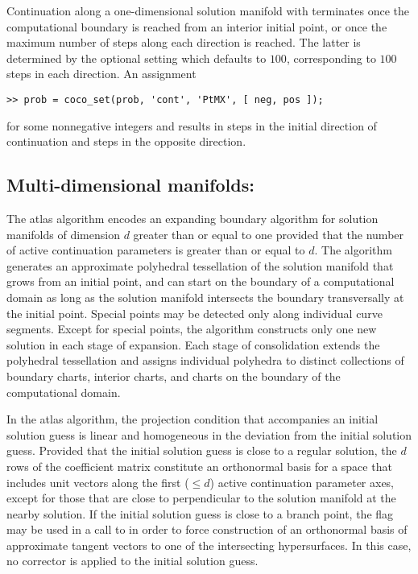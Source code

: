 Continuation along a one-dimensional solution manifold with  terminates once the computational boundary is reached from an interior initial point, or once the maximum number of steps along each direction is reached. The latter is determined by the optional setting  which defaults to $100$, corresponding to $100$ steps in each direction. An assignment
\begin{lstlisting}[language=coco-highlight]
>> prob = coco_set(prob, 'cont', 'PtMX', [ neg, pos ]);
\end{lstlisting}
for some nonnegative integers  and  results in  steps in the initial direction of continuation and  steps in the opposite direction.

\subsection{Multi-dimensional manifolds: }

The  atlas algorithm encodes an expanding boundary algorithm for solution manifolds of dimension $d$ greater than or equal to one provided that the number of active continuation parameters is greater than or equal to $d$. The algorithm generates an approximate polyhedral tessellation of the solution manifold that grows from an initial point, and can start on the boundary of a computational domain as long as the solution manifold intersects the boundary transversally at the initial point. Special points may be detected only along individual curve segments. Except for special points, the algorithm constructs only one new solution in each stage of expansion. Each stage of consolidation extends the polyhedral tessellation and assigns individual polyhedra to distinct collections of boundary charts, interior charts, and charts on the boundary of the computational domain.

In the  atlas algorithm, the projection condition that accompanies an initial solution guess is linear and homogeneous in the deviation from the initial solution guess. Provided that the initial solution guess is close to a regular solution, the $d$ rows of the coefficient matrix constitute an orthonormal basis for a space that includes unit vectors along the first ($\le d$) active continuation parameter axes, except for those that are close to perpendicular to the solution manifold at the nearby solution. If the initial solution guess is close to a branch point, the  flag may be used in a call to  in order to force construction of an orthonormal basis of approximate tangent vectors to one of the intersecting hypersurfaces. In this case, no corrector is applied to the initial solution guess.

